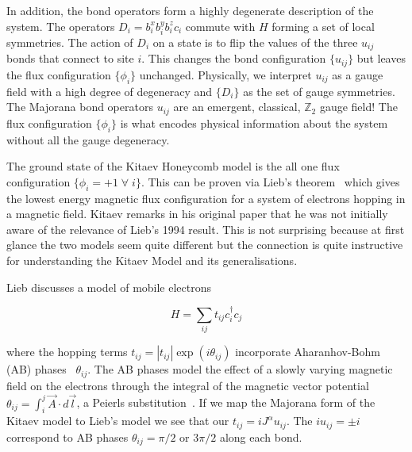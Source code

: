 In addition, the bond operators form a highly degenerate description of the system. The operators \(D_i = b^x_i b^y_i b^z_i c_i\) commute with \(H\) forming a set of local symmetries. The action of \(D_i\) on a state is to flip the values of the three \(u_{ij}\) bonds that connect to site \(i\). This changes the bond configuration \(\{u_{ij}\}\) but leaves the flux configuration \(\{\phi_i\}\) unchanged. Physically, we interpret \(u_{ij}\) as a gauge field with a high degree of degeneracy and \(\{D_i\}\) as the set of gauge symmetries. The Majorana bond operators \(u_{ij}\) are an emergent, classical, \(\mathbb{Z}_2\) gauge field! The flux configuration \(\{\phi_i\}\) is what encodes physical information about the system without all the gauge degeneracy.

The ground state of the Kitaev Honeycomb model is the all one flux configuration \(\{\phi_i = +1\; \forall \; i\}\). This can be proven via Lieb's theorem~\autocite{lieb_flux_1994} which gives the lowest energy magnetic flux configuration for a system of electrons hopping in a magnetic field. Kitaev remarks in his original paper that he was not initially aware of the relevance of Lieb's 1994 result. This is not surprising because at first glance the two models seem quite different but the connection is quite instructive for understanding the Kitaev Model and its generalisations.

Lieb discusses a model of mobile electrons

\[H = \sum_{ij} t_{ij} c^\dagger_i c_j\]

where the hopping terms \(t_{ij} = |t_{ij}|\exp(i\theta_{ij})\) incorporate Aharanhov-Bohm (AB) phases~\autocite{aharonovSignificanceElectromagneticPotentials1959} \(\theta_{ij}\). The AB phases model the effect of a slowly varying magnetic field on the electrons through the integral of the magnetic vector potential \(\theta_{ij} = \int_i^j \vec{A} \cdot d\vec{l}\), a Peierls substitution~\autocite{peierlsZurTheorieDiamagnetismus1933}. If we map the Majorana form of the Kitaev model to Lieb's model we see that our \(t_{ij} = i J^\alpha u_{ij}\). The \(i u_{ij} = \pm i\) correspond to AB phases \(\theta_{ij} = \pi/2\) or \(3\pi/2\) along each bond.

